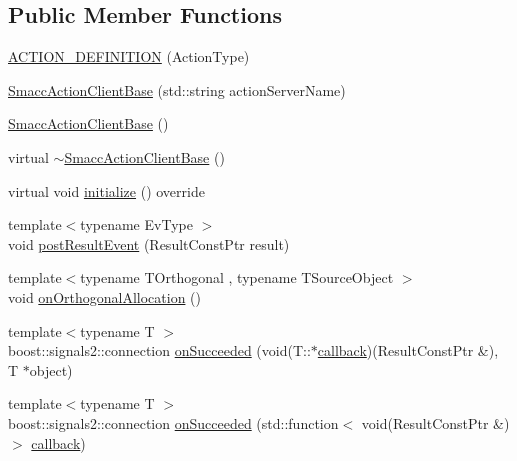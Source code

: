\subsection*{Public Member Functions}
\begin{DoxyCompactItemize}
\item 
\hyperlink{classsmacc_1_1client__bases_1_1SmaccActionClientBase_a2936b800b46ac557550cbeda563209b3}{A\+C\+T\+I\+O\+N\+\_\+\+D\+E\+F\+I\+N\+I\+T\+I\+ON} (Action\+Type)
\item 
\hyperlink{classsmacc_1_1client__bases_1_1SmaccActionClientBase_af38f27dd26f8a87fea6b3eaa4a84e604}{Smacc\+Action\+Client\+Base} (std\+::string action\+Server\+Name)
\item 
\hyperlink{classsmacc_1_1client__bases_1_1SmaccActionClientBase_a942113f29871c3e2c3fff9e951500805}{Smacc\+Action\+Client\+Base} ()
\item 
virtual \hyperlink{classsmacc_1_1client__bases_1_1SmaccActionClientBase_aa6daf2d88aa6254e5a5c10b2c2152fad}{$\sim$\+Smacc\+Action\+Client\+Base} ()
\item 
virtual void \hyperlink{classsmacc_1_1client__bases_1_1SmaccActionClientBase_a72967f255f85e35718a1e1b0b48c38ff}{initialize} () override
\item 
{\footnotesize template$<$typename Ev\+Type $>$ }\\void \hyperlink{classsmacc_1_1client__bases_1_1SmaccActionClientBase_ad84470e029cc996685f44ad0d4062c29}{post\+Result\+Event} (Result\+Const\+Ptr result)
\item 
{\footnotesize template$<$typename T\+Orthogonal , typename T\+Source\+Object $>$ }\\void \hyperlink{classsmacc_1_1client__bases_1_1SmaccActionClientBase_a925a611bc8035a0f70248c6ab11f4221}{on\+Orthogonal\+Allocation} ()
\item 
{\footnotesize template$<$typename T $>$ }\\boost\+::signals2\+::connection \hyperlink{classsmacc_1_1client__bases_1_1SmaccActionClientBase_af6d77c27d21b2e4f621f53c5f1df088b}{on\+Succeeded} (void(T\+::$\ast$\hyperlink{sm__ridgeback__barrel__search__2_2servers_2opencv__perception__node_2opencv__perception__node_8cpp_a050e697bd654facce10ea3f6549669b3}{callback})(Result\+Const\+Ptr \&), T $\ast$object)
\item 
{\footnotesize template$<$typename T $>$ }\\boost\+::signals2\+::connection \hyperlink{classsmacc_1_1client__bases_1_1SmaccActionClientBase_a92053df4ebfd0e49bbbd4ba191bf3975}{on\+Succeeded} (std\+::function$<$ void(Result\+Const\+Ptr \&)$>$ \hyperlink{sm__ridgeback__barrel__search__2_2servers_2opencv__perception__node_2opencv__perception__node_8cpp_a050e697bd654facce10ea3f6549669b3}{callback})

\end{DoxyCompactItemize}
